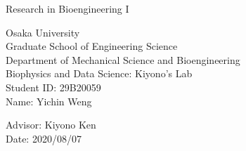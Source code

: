 \documentclass[12pt]{article}
\begin{document}
\setlength{\baselineskip}{15pt}
\thispagestyle{empty}
    \begin{center}
        \vspace{15cm}
        {\Huge Research in Bioengineering I}\\
    \end{center}
    \vspace{5cm}

    \begin{center}
        {\large Osaka University}\\
        \vspace{0.3cm}
        {\large Graduate School of Engineering Science}\\
        \vspace{0.3cm}
        {\large Department of Mechanical Science and Bioengineering}\\
        \vspace{0.3cm}
        {\large Biophysics and Data Science: Kiyono's Lab}\\
        \vspace{0.3cm}
        {\large Student ID: 29B20059}\\
        \vspace{0.3cm}
        {\large Name: Yichin Weng}\\
    \end{center}
    \vspace{2cm}

    \begin{center}
        {\large Advisor: Kiyono Ken}\\
        \vspace{2cm}
        {\large Date: 2020/08/07}
    \end{center}
    
    \newpage
    \thispagestyle{empty}
    \mbox{}

    \newpage
    \setcounter{page}{1} %


\end{document}
